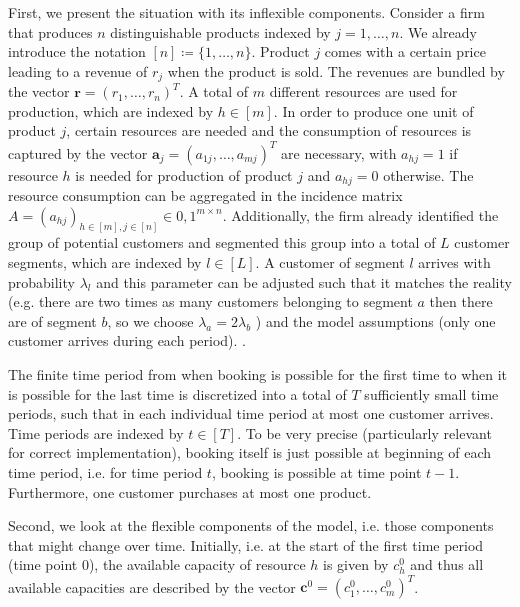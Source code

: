 First, we present the situation with its inflexible components. Consider a firm that produces $n$ distinguishable products indexed by $j = 1, \dots, n$. We already introduce the notation $[n] \coloneqq \{1, \dots, n\}$. Product $j$ comes with a certain price leading to a revenue of $r_j$ when the product is sold. The revenues are bundled by the vector $\boldsymbol{r} = (r_1, \dots, r_n)^T$. A total of $m$ different resources are used for production, which are indexed by  $h \in [m]$. In order to produce one unit of product $j$, certain resources are needed and the consumption of resources is captured by the vector $\boldsymbol{a}_j = (a_{1j}, \dots, a_{mj})^T$ are necessary, with $a_{hj}=1$ if resource $h$ is needed for production of product $j$ and $a_{hj} = 0$ otherwise. The resource consumption can be aggregated in the incidence matrix $A = (a_{hj})_{h\in [m], j \in [n]}\in {0, 1}^{m \times n}$. Additionally, the firm already identified the group of potential customers and segmented this group into a total of $L$ customer segments, which are indexed by $l \in [L]$. A customer of segment $l$ arrives with probability $\lambda_l$ and this parameter can be adjusted such that it matches the reality (e.g. there are two times as many customers belonging to segment $a$ then there are of segment $b$, so we choose $\lambda_a = 2\lambda_b$ ) and the model assumptions (only one customer arrives during each period).
. 

The finite time period from when booking is possible for the first time to when it is possible for the last time is discretized into a total of $T$ sufficiently small time periods, such that in each individual time period at most one customer arrives. Time periods are indexed by $t \in [T]$. To be very precise (particularly relevant for correct implementation), booking itself is just possible at beginning of each time period, i.e. for time period $t$, booking is possible at time point $t-1$. Furthermore, one customer purchases at most one product. 

Second, we look at the flexible components of the model, i.e. those components that might change over time. Initially, i.e. at the start of the first time period (time point 0), the available capacity of resource $h$ is given by $c_h^0$ and thus all available capacities are described by the vector $\boldsymbol{c}^0 = (c_1^0, \dots, c_m^0)^T$. 


